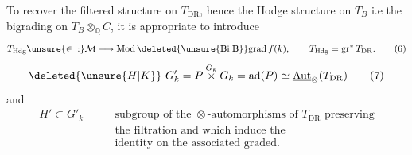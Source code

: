 To recover the filtered structure on $T_{\mathrm{DR}}$,  hence the Hodge structure on $T_B$ i.e the bigrading on $T_B\otimes_{\mathbb Q}C$, it is appropriate to introduce
\[
T_{\mathrm{Hdg}}\unsure{\in|\mathord{:}}\mathcal M\longrightarrow\operatorname{Mod}\deleted{\unsure{\mathrm{Bi}|\mathrm B}}\mathrm{grad}\,f(k),\qquad T_{\mathrm{Hdg}}=\operatorname{gr}^{*}T_{\mathrm{DR}}.\tag*{(6)}
\]
  
\[
\deleted{\unsure{H|K}}\ G'_k=P\overset{G_k}{\times}G_k=\operatorname{ad}(P)\simeq\underline{\operatorname{Aut}}_{\otimes}(T_{\mathrm{DR}})\tag*{(7)}
\]
 and
\[
\begin{aligned}
H'\subset G'_k\qquad &\text{subgroup of the $\otimes$-automorphisms of $T_{\mathrm{DR}}$ preserving}\\
&\text{the filtration and which induce the}\\
&\text{identity on the associated graded.}
\end{aligned}\tag*{(8)}
\]
\endgroup
